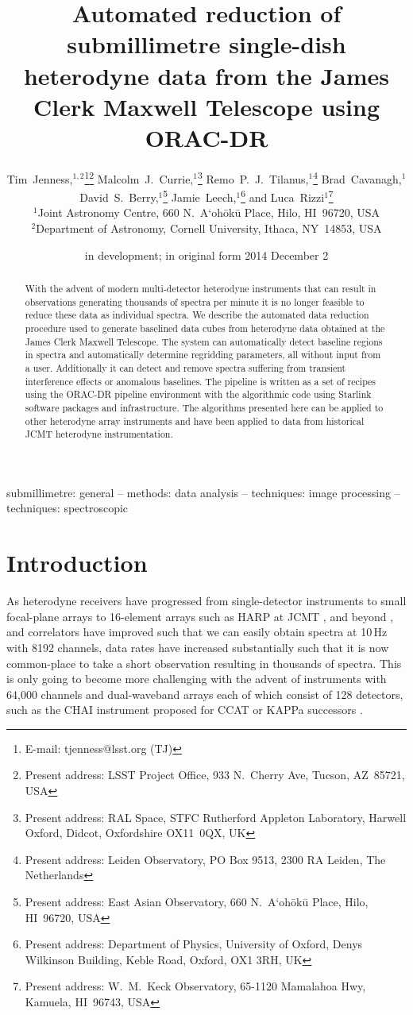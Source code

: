 \documentclass[a4paper,fleqn,usenatbib]{mnras}
\title[JCMT Heterodyne Data Reduction Pipeline]{Automated reduction of submillimetre single-dish heterodyne
  data from the James Clerk Maxwell Telescope using ORAC-DR}
\author[T. Jenness et al.]
{Tim~Jenness,$^{1,2}$\thanks{E-mail: tjenness@lsst.org (TJ)}\thanks{Present address: LSST Project Office, 933 N.\ Cherry Ave, Tucson, AZ~85721, USA}
Malcolm~J.~Currie,$^1$\thanks{Present address: RAL Space, STFC Rutherford Appleton Laboratory, Harwell Oxford, Didcot, Oxfordshire OX11~0QX, UK}
Remo~P.~J.~Tilanus,$^1$\thanks{Present address: Leiden Observatory, PO Box 9513, 2300 RA Leiden, The Netherlands}
Brad~Cavanagh,$^1$
\newauthor
David~S.~Berry,$^1$\thanks{Present address: East Asian Observatory, 660 N.\ A`oh\=ok\=u Place, Hilo, HI~96720, USA}
Jamie~Leech,$^1$\thanks{Present address: Department of Physics, University of
  Oxford, Denys Wilkinson Building, Keble Road, Oxford, OX1 3RH, UK}
and
Luca~Rizzi$^1$\thanks{Present address: W.\ M.\ Keck Observatory, 65-1120 Mamalahoa Hwy, Kamuela, HI~96743, USA}\\
$^1$Joint Astronomy Centre, 660 N.\ A`oh\=ok\=u Place, Hilo, HI~96720, USA \\
$^2$Department of Astronomy, Cornell University, Ithaca, NY~14853, USA
}
\date{in development; in original form 2014 December 2}
\begin{document}
\label{firstpage}
\pagerange{\pageref{firstpage}--\pageref{lastpage}}
\maketitle

\begin{abstract}

  With the advent of modern multi-detector heterodyne instruments that
  can result in observations generating thousands of spectra per
  minute it is no longer feasible to reduce these data as individual
  spectra. We describe the automated data reduction procedure used to
  generate baselined data cubes from heterodyne data obtained at the
  James Clerk Maxwell Telescope. The system can automatically detect baseline regions in
  spectra and automatically determine regridding parameters, all
  without input from a user. Additionally it can detect and remove
  spectra suffering from transient interference effects or anomalous
  baselines. The pipeline is written as a set of recipes using the
  ORAC-DR pipeline environment with the algorithmic code using
  Starlink software packages and infrastructure.  The algorithms
  presented here can be applied to other heterodyne array instruments
  and have been applied to data from historical JCMT heterodyne
  instrumentation.

\end{abstract}

\begin{keywords}
submillimetre: general --
methods: data analysis --
techniques: image processing --
techniques: spectroscopic

\end{keywords}

\section{Introduction}
\label{sec:intro}

As heterodyne receivers have progressed from single-detector
instruments
\citep{1992IJIMW..13.1487P,1992IJIMW..13..647D,1992IJIMW..13.1827C} to
small focal-plane arrays
\citep{2003SPIE.4855..322G,2004A&A...423.1171S} to 16-element arrays
such as HARP at JCMT \citep{2009MNRAS.399.1026B}, and beyond
\citep{2012SPIE.8452E..04K,2014SPIE.9153E..27H}, and correlators have improved such that
we can easily obtain spectra at 10\,Hz with 8192 channels, data rates
have increased substantially such that it is now common-place to take
a short observation resulting in thousands of spectra. This is only
going to become more challenging with the advent of instruments with
64,000 channels and dual-waveband arrays each of which consist of 128
detectors, such as the CHAI instrument proposed for CCAT
\citep{2014SPIE9152-109}
or KAPPa successors \citep{2014SPIE.9153E..0KW}.
\end{document}
